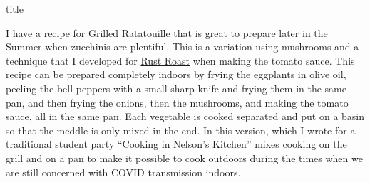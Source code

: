 \documentclass [11pt, letterpaper] {article}
\begin{document}
 {title}

I have a recipe for \href{GrilledRatatouille.html}{Grilled Ratatouille} that is great to prepare later in the Summer when zucchinis are plentiful. This is a variation using mushrooms and a technique that I developed for \href{RustRoast.html}{Rust Roast} when making the tomato sauce. This recipe can be prepared completely indoors by frying the eggplants in olive oil, peeling the bell peppers with a small sharp knife and frying them in the same pan, and then frying the onions, then the mushrooms, and making the tomato sauce, all in the same pan. Each vegetable is cooked separated and put on a basin so that the meddle is only mixed in the end. In this version, which I wrote for a traditional student party ``Cooking in Nelson's Kitchen'' mixes cooking on the grill and on a pan to make it possible to cook outdoors during the times when we are still concerned with COVID transmission indoors. 
\vspace{0.5in}
\end{document}
